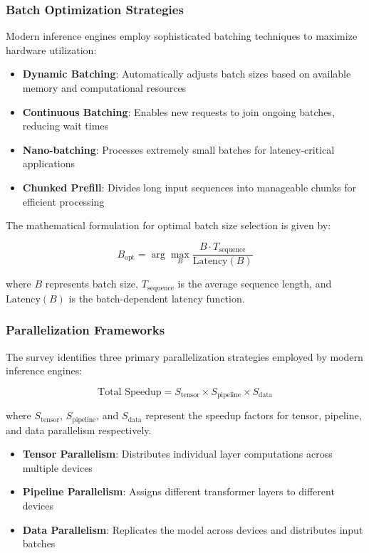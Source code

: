 \documentclass[12pt,a4paper]{article}
\begin{document}
\subsubsection{Batch Optimization Strategies}

Modern inference engines employ sophisticated batching techniques to maximize hardware utilization:

\begin{itemize}
    \item \textbf{Dynamic Batching}: Automatically adjusts batch sizes based on available memory and computational resources
    \item \textbf{Continuous Batching}: Enables new requests to join ongoing batches, reducing wait times
    \item \textbf{Nano-batching}: Processes extremely small batches for latency-critical applications
    \item \textbf{Chunked Prefill}: Divides long input sequences into manageable chunks for efficient processing
\end{itemize}

The mathematical formulation for optimal batch size selection is given by:

\begin{equation}
B_{\text{opt}} = \arg\max_B \frac{B \cdot T_{\text{sequence}}}{\text{Latency}(B)}
\end{equation}

where $B$ represents batch size, $T_{\text{sequence}}$ is the average sequence length, and $\text{Latency}(B)$ is the batch-dependent latency function.

\subsubsection{Parallelization Frameworks}

The survey identifies three primary parallelization strategies employed by modern inference engines:

\begin{equation}
\text{Total Speedup} = S_{\text{tensor}} \times S_{\text{pipeline}} \times S_{\text{data}}
\end{equation}

where $S_{\text{tensor}}$, $S_{\text{pipeline}}$, and $S_{\text{data}}$ represent the speedup factors for tensor, pipeline, and data parallelism respectively.

\begin{itemize}
    \item \textbf{Tensor Parallelism}: Distributes individual layer computations across multiple devices
    \item \textbf{Pipeline Parallelism}: Assigns different transformer layers to different devices
    \item \textbf{Data Parallelism}: Replicates the model across devices and distributes input batches
\end{itemize}
\end{document}
